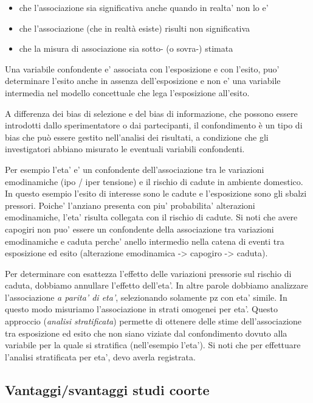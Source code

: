 \documentclass[]{book}
\begin{document}
\begin{itemize}
\item
  che l'associazione sia significativa anche quando in realta' non lo e'
\item
  che l'associazione (che in realtà esiste) risulti non significativa
\item
  che la misura di associazione sia sotto- (o sovra-) stimata
\end{itemize}

Una variabile confondente e' associata con l'esposizione e con l'esito, puo' determinare l'esito anche in assenza dell'esposizione e non e' una variabile intermedia nel modello concettuale che lega l'esposizione all'esito.

A differenza dei bias di selezione e del bias di informazione, che possono essere introdotti dallo sperimentatore o dai partecipanti, il confondimento è un tipo di bias che può essere gestito nell'analisi dei risultati, a condizione che gli investigatori abbiano misurato le eventuali variabili confondenti.

Per esempio l'eta' e' un confondente dell'associazione tra le variazioni emodinamiche (ipo / iper tensione) e il rischio di cadute in ambiente domestico. In questo esempio l'esito di interesse sono le cadute e l'esposizione sono gli sbalzi pressori. Poiche' l'anziano presenta con piu' probabilita' alterazioni emodinamiche, l'eta' risulta collegata con il rischio di cadute. Si noti che avere capogiri non puo' essere un confondente della associazione tra variazioni emodinamiche e caduta perche' anello intermedio nella catena di eventi tra esposizione ed esito (alterazione emodinamica -\textgreater{} capogiro -\textgreater{} caduta).

Per determinare con esattezza l'effetto delle variazioni pressorie sul rischio di caduta, dobbiamo annullare l'effetto dell'eta'. In altre parole dobbiamo analizzare l'associazione \emph{a parita' di eta'}, selezionando solamente pz con eta' simile. In questo modo misuriamo l'associazione in strati omogenei per eta'. Questo approccio (\emph{analisi stratificata}) permette di ottenere delle stime dell'associazione tra esposizione ed esito che non siano viziate dal confondimento dovuto alla variabile per la quale si stratifica (nell'esempio l'eta'). Si noti che per effettuare l'analisi stratificata per eta', devo averla registrata.

\hypertarget{vantaggisvantaggi-studi-coorte}{%
\subsection{Vantaggi/svantaggi studi coorte}\label{vantaggisvantaggi-studi-coorte}}
\end{document}
